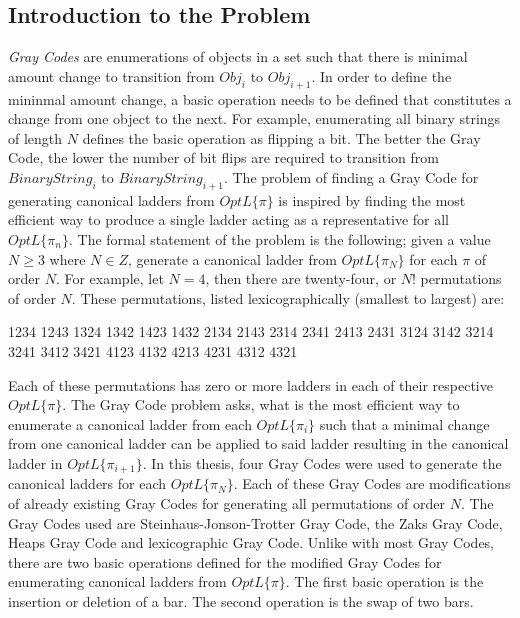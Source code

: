 
\subsection{Introduction to the Problem}
\emph{Gray Codes} are enumerations of objects in a set such that there is 
minimal amount change to transition from $Obj_{i}$ to $Obj_{i+1}$. In order 
to define the mininmal amount change, a basic operation needs to be defined that constitutes a change
from one object to the next. For example, enumerating all binary strings of length $N$ defines the basic 
operation as flipping a bit. The better the Gray Code, the lower the number of 
bit flips are required to transition from $BinaryString_{i}$ to $BinaryString_{i+1}$. 
The problem of finding a Gray Code for generating canonical ladders from $OptL\{\pi\}$ is inspired by finding the most efficient way to produce a 
single ladder acting as a  representative for all $OptL\{\pi_{n}\}$. The formal statement of the problem is the following; given a value 
$N\geq3$ where $N \in Z$, generate a canonical ladder from $OptL\{\pi_{N}\}$ for each $\pi$ of order $N$.
For example, let $N=4$, then there are twenty-four, or $N!$ permutations 
of order $N$. These permutations, listed lexicographically (smallest to largest)
are:

\begin{center}
\small{1234 1243}\newline
\small{1324 1342}\newline
\small{1423 1432}\newline
\small{2134 2143}\newline
\small{2314 2341}\newline
\small{2413 2431}\newline
\small{3124 3142}\newline
\small{3214 3241}\newline
\small{3412 3421}\newline
\small{4123 4132}\newline
\small{4213 4231}\newline
\small{4312 4321}\newline
\end{center}
Each of these permutations has zero or more ladders in each of their respective 
$OptL\{\pi\}$. The Gray Code problem asks, what is the most efficient way to enumerate 
a canonical ladder from each $OptL\{\pi_{i}\}$ such that a minimal change from 
one canonical ladder can be applied to said ladder resulting in the canonical 
ladder in $OptL\{\pi_{i+1}\}$. In this thesis, four Gray Codes were used to generate the canonical 
ladders for each $OptL\{\pi_{N}\}$. Each of these Gray Codes are modifications of already existing 
Gray Codes for generating all permutations of order $N$. The Gray Codes used 
are Steinhaus-Jonson-Trotter Gray Code, the Zaks Gray Code, Heaps Gray Code and lexicographic Gray Code.
Unlike with most Gray Codes, there are two basic operations defined for 
the modified Gray Codes for enumerating canonical ladders from $OptL\{\pi\}$.
The first basic operation is the insertion or deletion of a bar. The second 
operation is the swap of two bars. 

